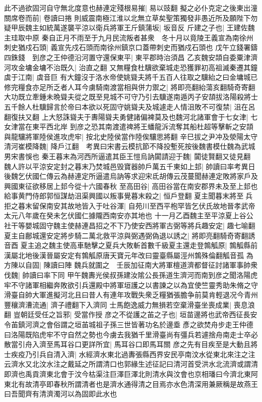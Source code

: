 此不過欲固河自守無北度意也赫連定殘根易摧|{
	易以豉翻}
擬之必仆克定之後東出潼關席卷而前|{
	卷讀曰捲}
則威震南極江淮以北無立草矣聖策獨發非愚近所及願陛下勿疑甲辰魏主如統萬遂襲平涼以衛兵將軍王斤鎮蒲坂|{
	坂音反}
斤建之子也|{
	王建佐魏主珪取中原}
秦自正月不雨至于九月民流叛者甚衆　冬十月以竟陵王義宣為南徐州刺史猶戍石頭|{
	義宣先戍石頭而南徐州鎮京口蓋帶刺史而猶戍石頭也}
戊午立錢署鑄四銖錢　到彦之王仲德沿河置守還保東平|{
	東平郡時治須昌}
乙亥魏安頡自委粟津濟河攻金墉金墉不治既久|{
	治直之翻}
又無糧食杜驥欲棄城走恐獲罪初高祖滅秦遷其鐘虡于江南|{
	虡音巨}
有大鐘沒于洛水帝使姚聳夫將千五百人往取之驥紿之曰金墉城已修完糧食亦足所乏者人耳今虜騎南渡當相與併力禦之|{
	將即亮翻紿蕩亥翻騎奇寄翻}
大功既立牽鍾未晩聳夫從之既至見城不可守乃引去驥遂南遁丙子安頡拔洛陽殺將士五千餘人杜驥歸言於帝曰本欲以死固守姚聳夫及城遽走人情沮敗不可復禁|{
	沮在呂翻復扶又翻}
上大怒誅聳夫于夀陽聳夫勇健諸偏裨莫及也魏河北諸軍會于七女津|{
	七女津當在東平西北岸}
到彦之恐其南渡遣禆將王蟠龍泝流奪其船杜超等擊斬之安頡與龍驤將軍陸侯進攻虎牢|{
	按北史陸侯當作陸俟驤思將翻}
辛巳拔之尹冲及滎陽太守清河崔模降魏|{
	降戶江翻　考異曰宋書云模抗節不降投塹死按後魏書模仕魏為武城男宋書悞也}
秦王暮末為河西所逼遣其臣王愷烏訥闐請迎于魏|{
	闐徒賢翻又徒見翻}
魏人許以平涼安定封之暮末乃焚城邑毁寶器帥戶萬五千東如上邽|{
	帥讀曰率考異日後魏乞伏國仁傳云為赫連定所逼遣烏訥等求迎宋氐胡傳云茂蔓聞赫連定敗將家戶及興國東征欲移居上邽今從十六國春秋}
至高田谷|{
	高田谷當在南安郡界未及至上邽也}
給事黄門侍郎郭恒謀劫沮渠興國以叛事覺暮末殺之|{
	恒戶登翻}
夏主聞暮末將至兵拒之暮末留保南安其故地皆入于吐谷渾|{
	自苑川至西平枹罕皆乞伏氏故地晉孝武帝太元八年歲在癸未乞伏國仁據隴西南安亦其地也}
十一月乙酉魏主至平涼夏上谷公社干等嬰城固守魏主使赫連昌招之不下乃使安西將軍古弼等將兵趣安定|{
	趣七喻翻}
夏主自鄜城還安定將步騎二萬北救平涼與弼遇弼偽退以誘之|{
	將即亮翻騎奇寄翻誘音酉}
夏主追之魏主使高車馳擊之夏兵大敗斬首數千級夏主還走登鶉觚原|{
	鶉觚縣前漢屬北地後漢晉屬安定有鶉觚原唐天寶元年改曰靈臺縣屬涇州鶉殊倫翻觚音孤}
為方陳以自固|{
	陳讀曰陣}
魏兵就圍之　壬辰加征南大將軍檀道濟都督征討諸軍事帥衆伐魏|{
	帥讀曰率下同}
甲午魏夀光侯叔孫建汝隂公長孫道生濟河而南到彦之聞洛陽虎牢不守諸軍相繼奔敗欲引兵還殿中將軍垣護之以書諫之以為宜使竺靈秀助朱脩之守滑臺自帥大軍進擬河北且曰昔人有連年攻戰失衆乏糧猶張膽争前莫肯輕退况今青州豐穰濟漕流通|{
	濟子禮翻下入濟同}
士馬飽逸威力無損若空棄滑臺坐喪成業|{
	喪息浪翻}
豈朝廷受任之旨邪|{
	受當作授}
彦之不從護之苖之子也|{
	垣苗邊將也武帝西征長安令苖鎮河濟之會俗謂之垣苖城祖子孫三世皆著功名於邊埀}
彥之欲焚舟步走王仲德曰洛陽既陷虎牢不守自然之勢也今虜去我猶千里滑臺尚有彊兵若遽捨舟南走士卒必散當引舟入濟至馬耳谷口更詳所宜|{
	馬耳谷口即馬耳關}
彦之先有目疾至是大動且將士疾疫乃引兵自清入濟|{
	水經濟水東北過夀張縣西界安民亭南汶水從東北來注之注云濟水又北汶水注之戴延之所謂清口也郭緣生述征記曰清河首受洪水北流濟或謂清即濟也禹貢濟東北會于汶今枯渠注巨澤巨澤北則清水與汶會也京相璠曰今濟北東阿東北有故清亭即春秋所謂清者也是濟水通得清之目焉亦水色清深用兼厥稱是故燕王曰吾聞齊有清濟濁河以為固即此水也}
